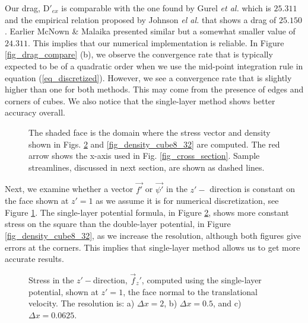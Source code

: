 Our drag, $\text{D}'_{ex}$ is comparable with the one found by Gurel {\it{et al.}} \cite{gurel_studies_1955} which is $25.311$ and the empirical relation proposed by Johnson {\it{el al.}}  \cite{johnson_drag_1987} that shows a drag of $25.150$. Earlier McNown \& Malaika \cite{mcnown_effects_1950} presented similar but a somewhat smaller value of $24.311$. 
This implies that our numerical implementation is reliable. In Figure \ref{fig_drag_compare} (b),
we observe the convergence rate that is typically expected to be of a quadratic order when we use the mid-point integration rule in equation (\ref{eq_discretized}). However, we see a convergence rate that is slightly higher than one for both methods. This may come from the presence of edges and corners of cubes. We also notice that the single-layer method shows better accuracy overall.
%
%
\begin{figure}[ht]
	\begin{center}
		\vspace{0.00cm}
		
		\vspace{0.25cm}
	\end{center}
	\caption{The shaded face is the domain where the stress vector and density shown in Figs. \ref{fig_stress_cube8_32} and \ref{fig_density_cube8_32} are computed. The red arrow shows the x-axis used in Fig. \ref{fig_cross_section}. Sample streamlines, discussed in next section, are shown as dashed lines.}
	\label{fig_sample_cube}
\end{figure}
\par
Next, we examine whether a vector $\vec{f'}$ or $\vec{\psi'}$ in the $z'-$ direction is constant on the face shown at $z'=1$ as we assume it is for numerical discretization, see Figure \ref{fig_sample_cube}.
The single-layer potential formula, in Figure \ref{fig_stress_cube8_32}, shows more constant stress on the square than the double-layer potential, in Figure \ref{fig_density_cube8_32}, as we increase the resolution, although both figures give errors at the corners. This implies that single-layer method allows us to get more accurate results.
\begin{figure}[ht]
	\begin{center}
		\vspace{0.25cm}
		
		\vspace{0.2cm}
	\end{center}
	\caption{Stress in the $z'-$direction, $\vec{f}_z'$, computed using the single-layer potential, shown at $z'=1$, the face normal to the translational velocity. The resolution is: a) $\Delta x = 2$, b) $\Delta x = 0.5$, and c) $\Delta x =  0.0625$.}
	\label{fig_stress_cube8_32}
\end{figure}
